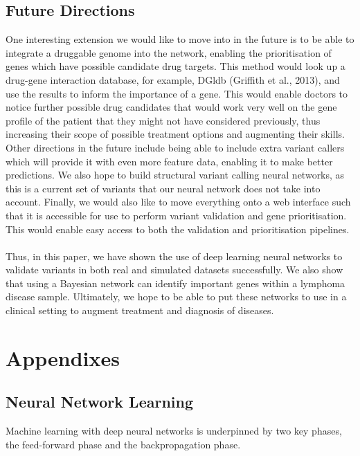 \documentclass{article}
\begin{document}
\subsection{Future Directions}
One interesting extension we would like to move into in the future is to be able to integrate a druggable genome into the network, enabling the prioritisation of genes which have possible candidate drug targets. This method would look up a drug-gene interaction database, for example, DGldb (Griffith et al., 2013), and use the results to inform the importance of a gene. This would enable doctors to notice further possible drug candidates that would work very well on the gene profile of the patient that they might not have considered previously, thus increasing their scope of possible treatment options and augmenting their skills. Other directions in the future include being able to include extra variant callers which will provide it with even more feature data, enabling it to make better predictions. We also hope to build structural variant calling neural networks, as this is a current set of variants that our neural network does not take into account. Finally, we would also like to move everything onto a web interface such that it is accessible for use to perform variant validation and gene prioritisation. This would enable easy access to both the validation and prioritisation pipelines. \\\\ Thus, in this paper, we have shown the use of deep learning neural networks to validate variants in both real and simulated datasets successfully. We also show that using a Bayesian network can identify important genes within a lymphoma disease sample. Ultimately, we hope to be able to put these networks to use in a clinical setting to augment treatment and diagnosis of diseases.


\newpage
\section{Appendixes}

\subsection{Neural Network Learning}
Machine learning with deep neural networks is underpinned by two key phases, the feed-forward phase and the backpropagation phase. 
\end{document}
